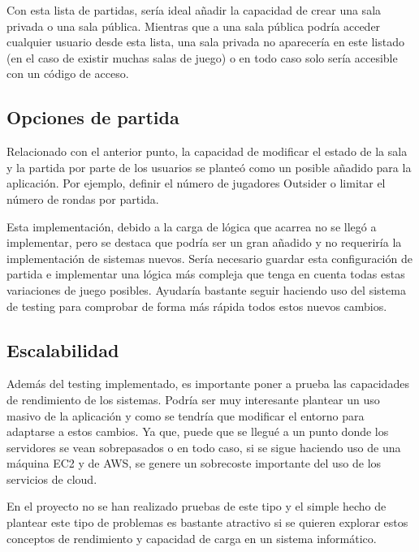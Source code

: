Con esta lista de partidas, sería ideal añadir la capacidad de crear una sala privada o una sala pública. Mientras que a una sala
pública podría acceder cualquier usuario desde esta lista, una sala privada no aparecería en este listado (en el caso de existir muchas
salas de juego) o en todo caso solo sería accesible con un código de acceso.

\subsection{Opciones de partida}
Relacionado con el anterior punto, la capacidad de modificar el estado de la sala y la partida por parte de los usuarios se planteó 
como un posible añadido para la aplicación. Por ejemplo, definir el número de jugadores Outsider o limitar el número de rondas
por partida.

Esta implementación, debido a la carga de lógica que acarrea no se llegó a implementar, pero se destaca que podría ser un gran
añadido y no requeriría la implementación de sistemas nuevos. Sería necesario guardar esta configuración de partida
e implementar una lógica más compleja que tenga en cuenta todas estas variaciones de juego posibles. Ayudaría bastante seguir haciendo
uso del sistema de testing para comprobar de forma más rápida todos estos nuevos cambios.

\subsection{Escalabilidad}
Además del testing implementado, es importante poner a prueba las capacidades de rendimiento de los sistemas. Podría ser
muy interesante plantear un uso masivo de la aplicación y como se tendría que modificar el entorno para adaptarse a estos cambios. Ya que, 
puede que se llegué a un punto donde los servidores se vean sobrepasados o en todo caso, si se sigue haciendo uso de una máquina
EC2 y de AWS, se genere un sobrecoste importante del uso de los servicios de cloud.

En el proyecto no se han realizado pruebas de este tipo y el simple hecho de plantear este tipo de problemas es bastante atractivo
si se quieren explorar estos conceptos de rendimiento y capacidad de carga en un sistema informático.
